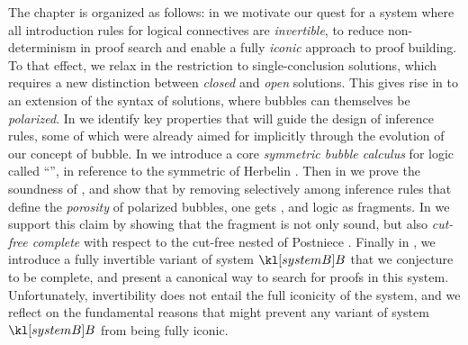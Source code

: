 The chapter is organized as follows: in  we motivate our
quest for a system where all introduction rules for logical connectives are
\emph{invertible}, to reduce non-determinism in proof search and enable a fully
\emph{iconic} approach to proof building. To that effect, we relax in
 the restriction to single-conclusion solutions, which
requires a new distinction between \emph{closed} and \emph{open} solutions. This
gives rise in  to an extension of the syntax of solutions, where
bubbles can themselves be \emph{polarized}. In  we identify
key properties that will guide the design of inference rules, some of which were
already aimed for implicitly through the evolution of our concept of bubble. In
 we introduce a core \emph{symmetric bubble calculus}
for  logic called ``'', in reference to the symmetric
 of Herbelin . Then in
 we prove the soundness of , and show
that by removing selectively among inference rules that define the
\emph{porosity} of polarized bubbles, one gets ,
 and  logic as fragments. In
 we support this claim by showing that the
 fragment is not only sound, but also \emph{cut-free complete}
with respect to the cut-free nested   of Postniece
\cite{postniece_deep_2009}. Finally in , we
introduce a fully invertible variant of system $\sysB$ that we conjecture to be
complete, and present a canonical way to search for proofs in this system.
Unfortunately, invertibility does not entail the full iconicity of the system,
and we reflect on the fundamental reasons that might prevent any variant of
system $\sysB$ from being fully iconic.


